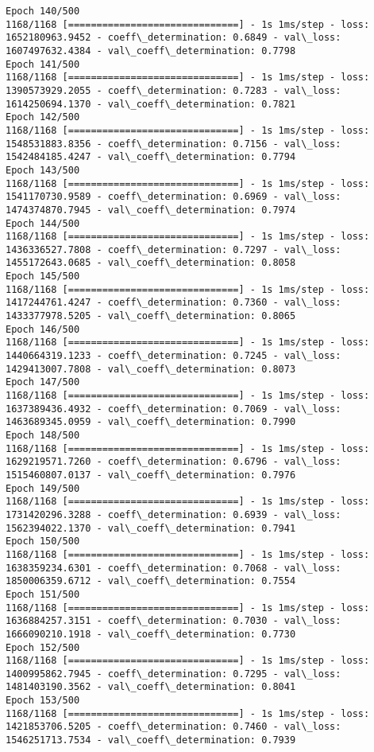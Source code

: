 \documentclass[11pt]{article}
\begin{document}
\begin{Verbatim}[commandchars=\\\{\}]
Epoch 140/500
1168/1168 [==============================] - 1s 1ms/step - loss: 1652180963.9452 - coeff\_determination: 0.6849 - val\_loss: 1607497632.4384 - val\_coeff\_determination: 0.7798
Epoch 141/500
1168/1168 [==============================] - 1s 1ms/step - loss: 1390573929.2055 - coeff\_determination: 0.7283 - val\_loss: 1614250694.1370 - val\_coeff\_determination: 0.7821
Epoch 142/500
1168/1168 [==============================] - 1s 1ms/step - loss: 1548531883.8356 - coeff\_determination: 0.7156 - val\_loss: 1542484185.4247 - val\_coeff\_determination: 0.7794
Epoch 143/500
1168/1168 [==============================] - 1s 1ms/step - loss: 1541170730.9589 - coeff\_determination: 0.6969 - val\_loss: 1474374870.7945 - val\_coeff\_determination: 0.7974
Epoch 144/500
1168/1168 [==============================] - 1s 1ms/step - loss: 1436336527.7808 - coeff\_determination: 0.7297 - val\_loss: 1455172643.0685 - val\_coeff\_determination: 0.8058
Epoch 145/500
1168/1168 [==============================] - 1s 1ms/step - loss: 1417244761.4247 - coeff\_determination: 0.7360 - val\_loss: 1433377978.5205 - val\_coeff\_determination: 0.8065
Epoch 146/500
1168/1168 [==============================] - 1s 1ms/step - loss: 1440664319.1233 - coeff\_determination: 0.7245 - val\_loss: 1429413007.7808 - val\_coeff\_determination: 0.8073
Epoch 147/500
1168/1168 [==============================] - 1s 1ms/step - loss: 1637389436.4932 - coeff\_determination: 0.7069 - val\_loss: 1463689345.0959 - val\_coeff\_determination: 0.7990
Epoch 148/500
1168/1168 [==============================] - 1s 1ms/step - loss: 1629219571.7260 - coeff\_determination: 0.6796 - val\_loss: 1515460807.0137 - val\_coeff\_determination: 0.7976
Epoch 149/500
1168/1168 [==============================] - 1s 1ms/step - loss: 1731420296.3288 - coeff\_determination: 0.6939 - val\_loss: 1562394022.1370 - val\_coeff\_determination: 0.7941
Epoch 150/500
1168/1168 [==============================] - 1s 1ms/step - loss: 1638359234.6301 - coeff\_determination: 0.7068 - val\_loss: 1850006359.6712 - val\_coeff\_determination: 0.7554
Epoch 151/500
1168/1168 [==============================] - 1s 1ms/step - loss: 1636884257.3151 - coeff\_determination: 0.7030 - val\_loss: 1666090210.1918 - val\_coeff\_determination: 0.7730
Epoch 152/500
1168/1168 [==============================] - 1s 1ms/step - loss: 1400995862.7945 - coeff\_determination: 0.7295 - val\_loss: 1481403190.3562 - val\_coeff\_determination: 0.8041
Epoch 153/500
1168/1168 [==============================] - 1s 1ms/step - loss: 1421853706.5205 - coeff\_determination: 0.7460 - val\_loss: 1546251713.7534 - val\_coeff\_determination: 0.7939

\end{Verbatim}
\end{document}
